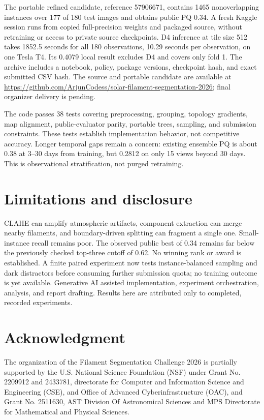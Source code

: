 \documentclass[sigconf]{acmart}
\begin{document}
The portable refined candidate, reference 57906671, contains 1465 nonoverlapping instances over 177 of 180 test images and obtains public PQ 0.34. A fresh Kaggle session runs from copied full-precision weights and packaged source, without retraining or access to private source checkpoints. D4 inference at tile size 512 takes 1852.5 seconds for all 180 observations, 10.29 seconds per observation, on one Tesla T4. Its 0.4079 local result excludes D4 and covers only fold 1. The archive includes a notebook, policy, package versions, checkpoint hash, and exact submitted CSV hash. The source and portable candidate are available at \url{https://github.com/ArjunCodess/solar-filament-segmentation-2026}; final organizer delivery is pending.

The code passes 38 tests covering preprocessing, grouping, topology gradients, map alignment, public-evaluator parity, portable trees, sampling, and submission constraints. These tests establish implementation behavior, not competitive accuracy. Longer temporal gaps remain a concern: existing ensemble PQ is about 0.38 at 3--30 days from training, but 0.2812 on only 15 views beyond 30 days. This is observational stratification, not purged retraining.

\section{Limitations and disclosure}
CLAHE can amplify atmospheric artifacts, component extraction can merge nearby filaments, and boundary-driven splitting can fragment a single one. Small-instance recall remains poor. The observed public best of 0.34 remains far below the previously checked top-three cutoff of 0.62. No winning rank or award is established. A finite paired experiment now tests instance-balanced sampling and dark distractors before consuming further submission quota; no training outcome is yet available. Generative AI assisted implementation, experiment orchestration, analysis, and report drafting. Results here are attributed only to completed, recorded experiments.

\section{Acknowledgment}\label{sec:acknowledgment}
    The organization of the Filament Segmentation Challenge 2026 is partially supported by the U.S. National Science Foundation (NSF) under Grant No. 2209912 and 2433781, directorate for Computer and Information Science and Engineering (CSE), and Office of Advanced Cyberinfrastructure (OAC), and Grant No. 2511630, AST Division Of Astronomical Sciences and MPS Directorate for Mathematical and Physical Sciences.
\end{document}
